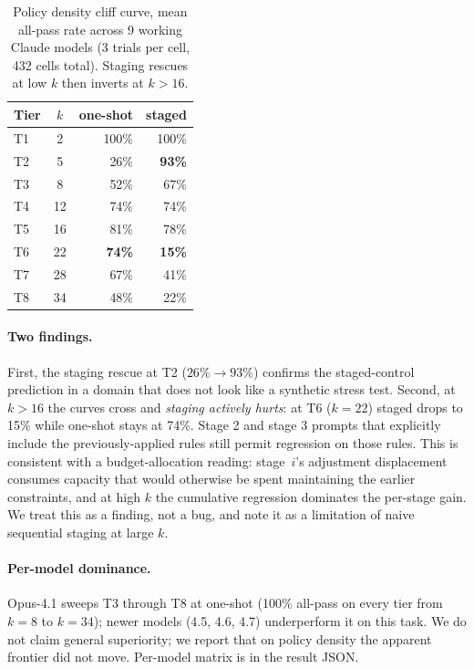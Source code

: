\documentclass{article}
\theoremstyle{plain}
\theoremstyle{definition}
\theoremstyle{remark}
\begin{document}
\begin{table}[ht]
\centering
\small
\caption{Policy density cliff curve, mean all-pass rate across 9 working Claude models (3 trials per cell, 432 cells total). Staging rescues at low $k$ then inverts at $k>16$.}
\label{tab:policy_density_curve}
\begin{tabular}{lcrr}
\toprule
Tier & $k$ & one-shot & staged \\
\midrule
T1 & 2  & 100\% & 100\% \\
T2 & 5  & 26\%  & \textbf{93\%} \\
T3 & 8  & 52\%  & 67\% \\
T4 & 12 & 74\%  & 74\% \\
T5 & 16 & 81\%  & 78\% \\
T6 & 22 & \textbf{74\%}  & \textbf{15\%} \\
T7 & 28 & 67\%  & 41\% \\
T8 & 34 & 48\%  & 22\% \\
\bottomrule
\end{tabular}
\end{table}

\paragraph{Two findings.} First, the staging rescue at T2 ($26\% \to 93\%$) confirms the staged-control prediction in a domain that does not look like a synthetic stress test. Second, at $k > 16$ the curves cross and \emph{staging actively hurts}: at T6 ($k{=}22$) staged drops to 15\% while one-shot stays at 74\%. Stage 2 and stage 3 prompts that explicitly include the previously-applied rules still permit regression on those rules. This is consistent with a budget-allocation reading: stage~$i$'s adjustment displacement consumes capacity that would otherwise be spent maintaining the earlier constraints, and at high $k$ the cumulative regression dominates the per-stage gain. We treat this as a finding, not a bug, and note it as a limitation of naive sequential staging at large $k$.

\paragraph{Per-model dominance.} Opus-4.1 sweeps T3 through T8 at one-shot (100\% all-pass on every tier from $k{=}8$ to $k{=}34$); newer models (4.5, 4.6, 4.7) underperform it on this task. We do not claim general superiority; we report that on policy density the apparent frontier did not move. Per-model matrix is in the result JSON.
\end{document}
